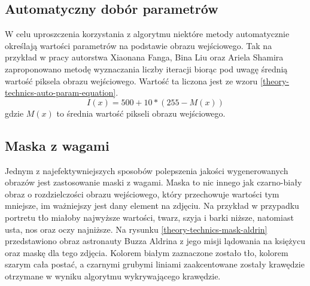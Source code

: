         \subsection{Automatyczny dobór parametrów}  \label{theory-technics-auto-param}
        W celu uproszczenia korzystania z algorytmu niektóre metody automatycznie określają wartości parametrów na podstawie obrazu wejściowego. Tak na przykład w pracy autorstwa Xiaonana Fanga, Bina Liu oraz Ariela Shamira \cite{article-string-art-xiaonan} zaproponowano metodę wyznaczania liczby iteracji biorąc pod uwagę średnią wartość piksela obrazu wejściowego. Wartość ta liczona jest ze wzoru \ref{theory-technics-auto-param-equation}. 
        \begin{equation} \label{theory-technics-auto-param-equation}
            I(x) = 500 + 10 * (255 - M(x))
        \end{equation}
        gdzie \(M(x)\) to średnia wartość pikseli obrazu wejściowego.
        
        \subsection{Maska z wagami}
        Jednym z najefektywniejszych sposobów polepszenia jakości wygenerowanych obrazów jest zastosowanie maski z wagami. Maska to nic innego jak czarno-biały obraz o rozdzielczości obrazu wejściowego, który przechowuje wartości tym mniejsze, im ważniejszy jest dany element na zdjęciu. Na przykład w przypadku portretu tło miałoby najwyższe wartości, twarz, szyja i barki niższe, natomiast usta, nos oraz oczy najniższe. Na rysunku \ref{theory-technics-mask-aldrin} przedstawiono obraz astronauty Buzza Aldrina z jego misji lądowania na księżycu oraz maskę dla tego zdjęcia. Kolorem białym zaznaczone zostało tło, kolorem szarym cała postać, a czarnymi grubymi liniami zaakcentowane zostały krawędzie otrzymane w wyniku algorytmu wykrywającego krawędzie.
        
